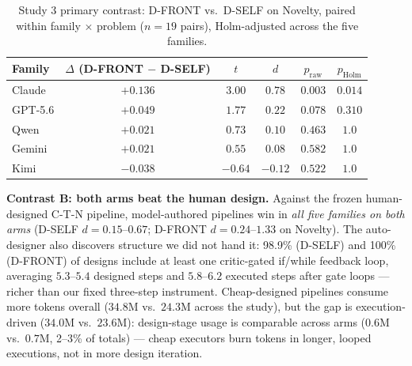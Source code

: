 \documentclass[12pt,a4paper]{article}
\begin{document}
\begin{table}[ht]
  \centering
  \caption{Study 3 primary contrast: D-FRONT vs.\ D-SELF on Novelty, paired
  within family $\times$ problem ($n = 19$ pairs), Holm-adjusted across the
  five families.}
  \label{tab:study3-authorship}
  \begin{tabular}{@{}l c c c c c@{}}
    \toprule
    \textbf{Family} & $\Delta$ (D-FRONT $-$ D-SELF) & $t$ & $d$ &
      $p_{\text{raw}}$ & $p_{\text{Holm}}$ \\
    \midrule
    Claude & $+0.136$ & $3.00$ & $0.78$ & $0.003$ & $\mathbf{0.014}$ \\
    GPT-5.6 & $+0.049$ & $1.77$ & $0.22$ & $0.078$ & $0.310$ \\
    Qwen & $+0.021$ & $0.73$ & $0.10$ & $0.463$ & $1.0$ \\
    Gemini & $+0.021$ & $0.55$ & $0.08$ & $0.582$ & $1.0$ \\
    Kimi & $-0.038$ & $-0.64$ & $-0.12$ & $0.522$ & $1.0$ \\
    \bottomrule
  \end{tabular}
\end{table}

\textbf{Contrast B: both arms beat the human design.} Against the frozen
human-designed C-T-N pipeline, model-authored pipelines win in \emph{all five
families on both arms} (D-SELF $d = 0.15$--$0.67$; D-FRONT $d = 0.24$--$1.33$
on Novelty). The auto-designer also discovers structure we did not hand it:
98.9\% (D-SELF) and 100\% (D-FRONT) of designs include at least one
critic-gated if/while feedback loop, averaging $5.3$--$5.4$ designed steps and
$5.8$--$6.2$ executed steps after gate loops --- richer than our fixed
three-step instrument. Cheap-designed pipelines consume more tokens overall
($34.8$M vs.\ $24.3$M across the study), but the gap is execution-driven
($34.0$M vs.\ $23.6$M): design-stage usage is comparable across arms
($0.6$M vs.\ $0.7$M, 2--3\% of totals) --- cheap executors burn tokens in
longer, looped executions, not in more design iteration.
\end{document}
